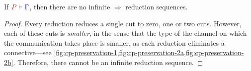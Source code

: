 \begin{theorem}[Termination]\label{thm:cp-termination}
  If $\seq[{ P }]{ \Gamma }$, then there are no infinite $\Longrightarrow$
  reduction sequences.
\end{theorem}
  \begin{proof}
    Every reduction reduces a single cut to zero, one or two cuts.
    However, each of these cuts is \emph{smaller}, in the sense that the type of
    the channel on which the communication takes place is smaller, as each
    reduction eliminates a connective---see
    \cref{fig:cp-preservation-1,fig:cp-preservation-2a,fig:cp-preservation-2b}.
    Therefore, there cannot be an infinite reduction sequence.
  \end{proof}
